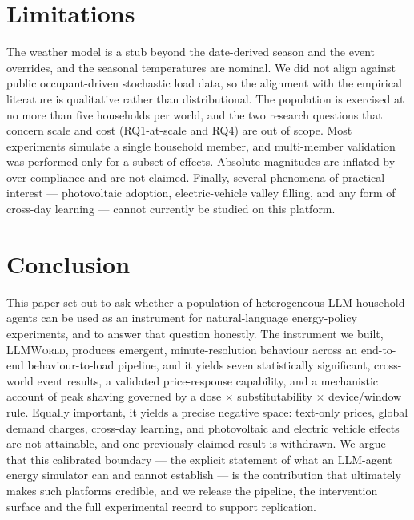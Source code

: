 \documentclass[11pt]{article}
\begin{document}
\section{Limitations}
The weather model is a stub beyond the date-derived season and the event overrides, and the seasonal
temperatures are nominal. We did not align against public occupant-driven stochastic load data, so the
alignment with the empirical literature is qualitative rather than distributional. The population is
exercised at no more than five households per world, and the two research questions that concern scale and
cost (RQ1-at-scale and RQ4) are out of scope. Most experiments simulate a single household member, and
multi-member validation was performed only for a subset of effects. Absolute magnitudes are inflated by
over-compliance and are not claimed. Finally, several phenomena of practical interest --- photovoltaic
adoption, electric-vehicle valley filling, and any form of cross-day learning --- cannot currently be
studied on this platform.

\section{Conclusion}
This paper set out to ask whether a population of heterogeneous LLM household agents can be used as an
instrument for natural-language energy-policy experiments, and to answer that question honestly. The
instrument we built, \textsc{LLMWorld}, produces emergent, minute-resolution behaviour across an
end-to-end behaviour-to-load pipeline, and it yields seven statistically significant, cross-world event
results, a validated price-response capability, and a mechanistic account of peak shaving governed by a
dose $\times$ substitutability $\times$ device/window rule. Equally important, it yields a precise
negative space: text-only prices, global demand charges, cross-day learning, and photovoltaic and electric
vehicle effects are not attainable, and one previously claimed result is withdrawn. We argue that this
calibrated boundary --- the explicit statement of what an LLM-agent energy simulator can and cannot
establish --- is the contribution that ultimately makes such platforms credible, and we release the
pipeline, the intervention surface and the full experimental record to support replication.
\end{document}
